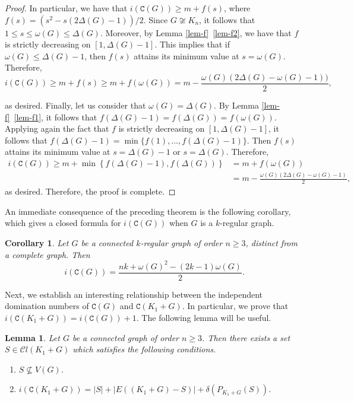 \documentclass[12pt]{article}
\newtheorem{lemma}[remark]{Lemma}
\newtheorem{corollary}[remark]{Corollary}
\begin{document}
\begin{proof}
\vspace{.15cm}

\noindent
In particular, we have that $i(\mathtt{C}(G))\geq m+f(s)$, where $f(s) =(s^2-s(2\Delta(G)-1))/2$. Since $G\not\cong K_n$, it follows that $1\leq s\leq \omega(G)\leq \Delta(G)$. Moreover, by Lemma \ref{lem-f}~\ref{lem-f2}, we have that $f$ is strictly decreasing on $[1,\Delta(G)-1]$. This implies that if $\omega(G)\leq \Delta(G)-1$, then $f(s)$ attains its minimum value at $s=\omega(G)$. Therefore, 
$$i(\mathtt{C}(G))\geq m+f(s)\geq m +f(\omega(G)) = m-\frac{\omega(G)(2\Delta(G)- \omega(G) - 1) )}{2},$$

\noindent
as desired. Finally, let us consider that $\omega(G)=\Delta(G)$. By Lemma \ref{lem-f}~\ref{lem-f1}, it follows that $f(\Delta(G)-1)=f(\Delta(G))=f(\omega(G))$. Applying again the fact that $f$ is strictly decreasing on $[1,\Delta(G)-1]$, it follows that $f(\Delta(G)-1)=\min\{f(1),\ldots, f(\Delta(G)-1)\}$. Then $f(s)$ attains its minimum value at $s=\Delta(G)-1$ or $s=\Delta(G)$. Therefore,
\begin{equation*}
\begin{split}
i(\mathtt{C}(G)) \geq m+\min\left\{f(\Delta(G)-1),f(\Delta(G))\right\}&= m +f(\omega(G))\\[5pt] 
&= m - \frac{\omega(G) (2\Delta(G) - \omega(G) - 1)}{2},
\end{split}
\end{equation*}
as desired. Therefore, the proof is complete.
\end{proof}

\noindent
An immediate consequence of the preceding theorem is the following corollary, which gives a closed formula for $i(\mathtt{C}(G))$ when $G$ is a $k$-regular graph.

\begin{corollary}
Let $G$ be a connected $k$-regular graph of order $n\geq 3$, distinct from a complete graph. Then
$$i(\mathtt{C}(G)) = \frac{nk+ \omega(G)^{2} - (2k-1) \omega(G)}{2}.$$
\end{corollary}

\vspace{.2cm}

\noindent	
Next, we establish an interesting relationship between the independent domination numbers of $\mathtt{C}(G)$ and $\mathtt{C}(K_1+G)$. In particular, we prove that $i(\mathtt{C}(K_1+G)) = i(\mathtt{C}(G))+1.$ The following lemma will be useful.

\begin{lemma}\label{lem:K1G}
Let $G$ be a connected graph of order $n\geq 3$. Then there exists a set $S \in \mathcal{C}l(K_1+G)$ which satisfies the following conditions.
\begin{enumerate}[label={\rm(\roman*)}]
\item \label{lem-k11} $S\not\subseteq V(G)$.
\item \label{lem-k12} $i(\mathtt{C}(K_1+G)) = |S| + |E((K_1+G)-S)| + \delta(P_{K_1+G}(S))$.
\end{enumerate}
\end{lemma}
\end{document}
